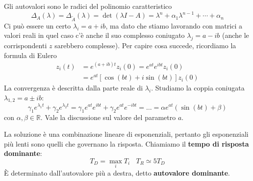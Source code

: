 Gli autovalori sono le radici del polinomio caratteristico
\begin{equation*}
	\Delta _A\left(\lambda \right) =\Delta _{\tilde{A}}\left(\lambda \right) =\det\left(\lambda I-A\right) =\lambda ^n +\alpha _1 \lambda ^{n-1} +\cdots +\alpha _n
\end{equation*}
Ci può essere un certo $\lambda _i =a+ib$, ma dato che stiamo lavorando con matrici a valori reali in quel caso c'è anche il suo complesso coniugato $\lambda _j =a-ib$ (anche le corrispondenti $z$ sarebbero complesse). Per capire cosa succede, ricordiamo la formula di Eulero
\begin{equation*}
	\begin{aligned}
		z_i\left(t\right) & =e^{\left(a+ib\right) t} z_i\left(0\right) =e^{at} e^{ibt} z_i\left(0\right)    \\
		                   & =e^{at}\left[\cos\left(bt\right) +i\sin\left(bt\right)\right] z_i\left(0\right) 
	\end{aligned}
\end{equation*}
La convergenza è descritta dalla parte reale di $\lambda _i$. Studiamo la coppia coniugata $\lambda _{1,2} =a\pm ib$:
\begin{equation*}
	\gamma _1 e^{\lambda _1 t} +\gamma _2 e^{\lambda _2 t} =\gamma _1 e^{at} e^{ibt} +\gamma _2 e^{at} e^{-ibt} =\dotsc =\alpha e^{at}\left(\sin\left(bt\right) +\beta \right)
\end{equation*}
con $\alpha ,\beta \in \mathbb{R}$. Vale la discussione sul valore del parametro $a$.

La soluzione è una combinazione lineare di esponenziali, pertanto gli esponenziali più lenti sono quelli che governano la risposta. Chiamiamo il \textbf{tempo di risposta dominante}:
\begin{equation*}
	\boxed{T_D =\max_i T_i} \ \ \ \ \boxed{T_R \simeq 5T_D}
\end{equation*}
È determinato dall'autovalore più a destra, detto \textbf{autovalore dominante}.

